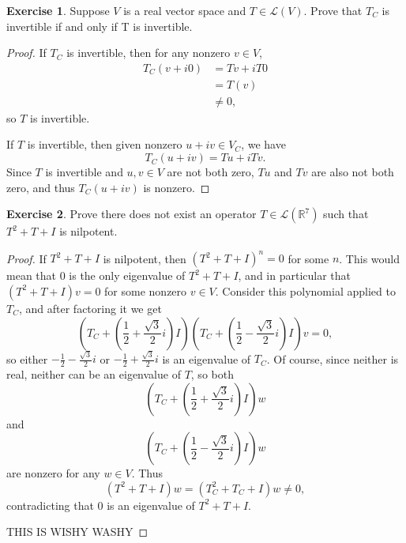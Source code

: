 \documentclass{article}
\theoremstyle{definition}
\newtheorem{ex}{Exercise}
\begin{document}
\setcounter{ex}{5}

\begin{ex}
	Suppose $V$ is a real vector space and $T \in \mathcal{L}(V)$. Prove that $T_C$ is invertible if and only if T is invertible.
\end{ex}
\begin{proof}
	If $T_C$ is invertible, then for any nonzero $v \in V$, \begin{align*}
		T_C(v + i0) & = Tv + iT0 \\
		            & = T(v)     \\
		            & \neq 0,
	\end{align*} so $T$ is invertible.

	If $T$ is invertible, then given nonzero $u + iv \in V_C$, we have \begin{equation*}
		T_C(u + iv) = Tu + iTv.
	\end{equation*}
	Since $T$ is invertible and $u, v \in V$ are not both zero, $Tu$ and $Tv$ are also not both zero, and thus $T_C(u + iv)$ is nonzero.
\end{proof}

\setcounter{ex}{8}

\begin{ex}
	Prove there does not exist an operator $T \in \mathcal{L}(\mathbb{R}^7)$ such that $T^2 + T + I$ is nilpotent.
\end{ex}
\begin{proof}
	If  $T^2 + T + I$ is nilpotent, then $(T^2 + T + I)^n = 0$ for some $n$.
	This would mean that 0 is the only eigenvalue of $T^2 + T + I$, and in particular that $(T^2 + T + I)v = 0$ for some nonzero $v \in V$.
  Consider this polynomial applied to $T_C$, and after factoring it we get \begin{equation*}
		\left(T_C + \left(\frac{1}{2} + \frac{\sqrt{3}}{2}i\right)I\right)\left(T_C + \left(\frac{1}{2} - \frac{\sqrt{3}}{2}i\right)I\right)v = 0,
	\end{equation*}
	so either $-\frac{1}{2} - \frac{\sqrt{3}}{2}i$ or $-\frac{1}{2} + \frac{\sqrt{3}}{2}i$ is an eigenvalue of $T_C$.
  Of course, since neither is real, neither can be an eigenvalue of $T$, so both \begin{equation*}
    \left( T_C + \left( \frac{1}{2} + \frac{\sqrt{3}}{2}i \right) I \right)w
  \end{equation*}
  and \begin{equation*}
    \left( T_C + \left( \frac{1}{2} - \frac{\sqrt{3}}{2}i \right) I \right)w
  \end{equation*}
  are nonzero for any $w \in V$.
  Thus \begin{equation*}
     (T^2 + T + I)w = (T_C^2 + T_C + I)w \neq 0,
  \end{equation*}
  contradicting that $0$ is an eigenvalue of $T^2 + T + I$.

  THIS IS WISHY WASHY
\end{proof}
\end{document}
